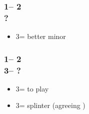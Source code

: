 \documentclass[12pt, a4paper]{report}
\begin{document}
{    \subsubsection*{1\nt -- 2\nt\\
                    ?}
    \begin{itemize}
        \item 3\minor = better minor
    \end{itemize}

    \subsubsection*{1\nt -- 2\nt\\
                    3\minor -- ?}
    \begin{itemize}
        \item 3\diams = to play
        \item 3\major = splinter (agreeing \diams)
    \end{itemize}
}
\end{document}
